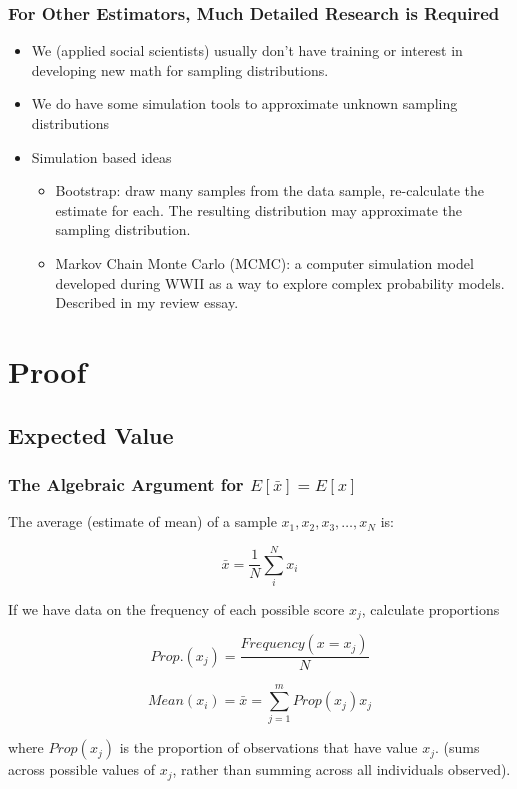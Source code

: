 \documentclass[10pt,english]{beamer}
\begin{document}
\begin{frame}
  \frametitle{For Other Estimators, Much Detailed Research is Required }
  \begin{itemize}
  \item We (applied social scientists) usually don't have training
    or interest in developing new math for sampling distributions.
  \item We do have some simulation tools to approximate unknown
    sampling distributions
  \item Simulation based ideas
    \begin{itemize}
    \item Bootstrap: draw many samples from the data sample,
      re-calculate the estimate for each. The resulting
      distribution may approximate the sampling distribution.
    \item Markov Chain Monte Carlo (MCMC): a computer simulation
      model developed during WWII as a way to explore complex
      probability models. Described in my review essay.
    \end{itemize}
  \end{itemize}
\end{frame}


\section{Proof}

\subsection{Expected Value}
\begin{frame}
\frametitle{The Algebraic Argument for $E[\bar{x}]=E[x]$}

The average (estimate of mean) of a sample ${x_1, x_2, x_3, \ldots,x_N}$ is:

\begin{equation}
\bar{x}=\frac{1}{N} \sum_{i}^{N} x_{i}\label{eq:-2}
\end{equation}

If we have data on the frequency of each possible score $x_{j}$, calculate proportions

\begin{equation}
  Prop.(x_{j})=\frac{Frequency(x=x_{j})}{N}
 \end{equation}

\begin{equation}
Mean(x_{i})=\bar{x} = \sum_{j=1}^{m} Prop(x_{j})x_{j}\label{eq:-3}\end{equation}

where $Prop(x_{j})$ is the proportion of observations that
have value $x_{j}$. (sums across possible values of $x_j$, rather than
summing across all individuals observed).

\end{frame}
\end{document}
